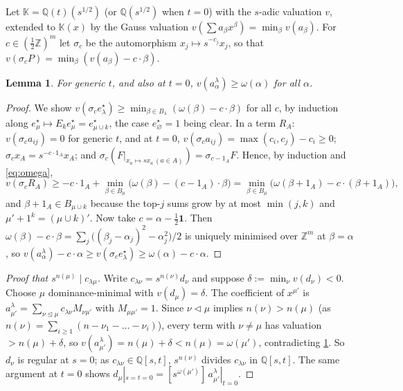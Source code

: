 \documentclass[11pt]{amsart}
\newtheorem{lemma}[theorem]{Lemma}
\theoremstyle{definition}
\theoremstyle{remark}
\numberwithin{equation}{section}
\begin{document}
Let $\mathbb{K}=\mathbb{Q}(t)(s^{1/2})$ (or $\mathbb{Q}(s^{1/2})$ when $t=0$) with the $s$-adic valuation $v$, extended to $\mathbb{K}(x)$ by the Gauss valuation $v(\sum a_\beta x^\beta)=\min_\beta v(a_\beta)$. For $c\in(\frac12\mathbb{Z})^m$ let $\sigma_c$ be the automorphism $x_j\mapsto s^{-c_j}x_j$, so that $v(\sigma_cP)=\min_\beta(v(a_\beta)-c\cdot\beta)$.

\begin{lemma}\label{lem:valA}
For generic $t$, and also at $t=0$, $v(a^\lambda_\alpha)\ge\omega(\alpha)$ for all $\alpha$.
\end{lemma}
\begin{proof}
We show $v(\sigma_ce^\star_\lambda)\ge\min_{\beta\in B_\lambda}(\omega(\beta)-c\cdot\beta)$ for all $c$, by induction along $e^\star_\mu\mapsto E_ke^\star_\mu=e^\star_{\mu\cup k}$, the case $e^\star_\varnothing=1$ being clear. In a term $R_A$: $v(\sigma_ca_{ij})=0$ for generic $t$, and at $t=0$, $v(\sigma_ca_{ij})=\max(c_i,c_j)-c_i\ge0$; $\sigma_cx_A=s^{-c\cdot1_A}x_A$; and $\sigma_c(F|_{x_a\mapsto sx_a\,(a\in A)})=\sigma_{c-1_A}F$. Hence, by induction and \eqref{eq:omega},
\[ v(\sigma_cR_A)\ge-c\cdot1_A+\min_{\beta\in B_\mu}\bigl(\omega(\beta)-(c-1_A)\cdot\beta\bigr)=\min_{\beta\in B_\mu}\bigl(\omega(\beta+1_A)-c\cdot(\beta+1_A)\bigr), \]
and $\beta+1_A\in B_{\mu\cup k}$ because the top-$j$ sums grow by at most $\min(j,k)$ and $\mu'+1^k=(\mu\cup k)'$. Now take $c=\alpha-\frac12\mathbf{1}$. Then $\omega(\beta)-c\cdot\beta=\sum_j\bigl((\beta_j-\alpha_j)^2-\alpha_j^2\bigr)/2$ is uniquely minimised over $\mathbb{Z}^m$ at $\beta=\alpha$, so $v(a^\lambda_\alpha)-c\cdot\alpha\ge v(\sigma_ce^\star_\lambda)\ge\omega(\alpha)-c\cdot\alpha$.
\end{proof}

\begin{proof}[Proof that $s^{n(\mu)}\mid c_{\lambda\mu}$]
Write $c_{\lambda\nu}=s^{n(\nu)}d_\nu$ and suppose $\delta:=\min_\nu v(d_\nu)<0$. Choose $\mu$ dominance-minimal with $v(d_\mu)=\delta$. The coefficient of $x^{\mu'}$ is $a^\lambda_{\mu'}=\sum_{\nu\trianglelefteq\mu}c_{\lambda\nu}M_{\nu\mu'}$ with $M_{\mu\mu'}=1$. Since $\nu\triangleleft\mu$ implies $n(\nu)>n(\mu)$ (as $n(\nu)=\sum_{i\ge1}(n-\nu_1-\dots-\nu_i)$), every term with $\nu\ne\mu$ has valuation $>n(\mu)+\delta$, so $v(a^\lambda_{\mu'})=n(\mu)+\delta<n(\mu)=\omega(\mu')$, contradicting \cref{lem:valA}. So $d_\nu$ is regular at $s=0$; as $c_{\lambda\nu}\in\mathbb{Q}[s,t]$, $s^{n(\nu)}$ divides $c_{\lambda\nu}$ in $\mathbb{Q}[s,t]$. The same argument at $t=0$ shows $d_\mu|_{s=t=0}=[s^{\omega(\mu')}]\,a^\lambda_{\mu'}|_{t=0}$.
\end{proof}
\end{document}
